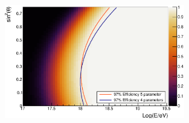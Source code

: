 \documentclass[12pt,a4paper]{article}
\begin{document}
\begin{figure}[h]
\begin{center}
\includegraphics[width=0.7\textwidth]{plots/SurfaceNew.eps}
\caption{
\label{fig:surfaceNew}}
\end{center}
\end{figure}


\begin{thebibliography}{99}

\end{thebibliography} 
\end{document}
